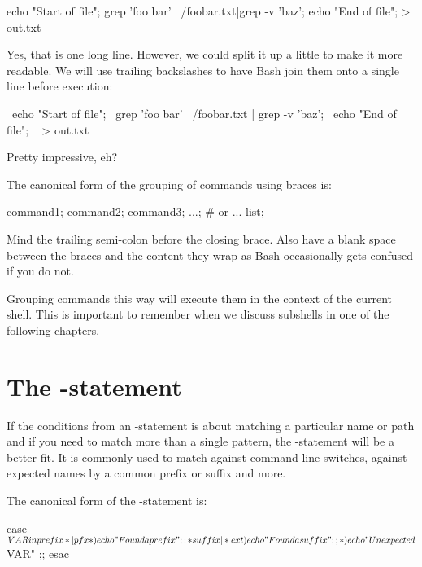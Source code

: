 \documentclass{olli-handout}
\begin{document}
\begin{lstbash}
{ echo "Start of file"; grep 'foo bar' ~/foobar.txt|grep -v 'baz'; echo "End of file"; } > out.txt
\end{lstbash}

Yes, that is one long line. However, we could split it up a little to make it more readable. We will use trailing backslashes to have Bash join them onto a single line before execution:

\begin{lstbash}
{ \
  echo "Start of file"; \
  grep 'foo bar' ~/foobar.txt | grep -v 'baz'; \
  echo "End of file"; \
} > out.txt
\end{lstbash}

Pretty impressive, eh?

The canonical form of the grouping of commands using braces is:

\begin{lstbash}
{ command1; command2; command3; ...; }
# or ...
{ list; }
\end{lstbash}

Mind the trailing semi-colon before the closing brace. Also have a blank space between the braces and the content they wrap as Bash occasionally gets confused if you do not.

Grouping commands this way will execute them in the context of the current shell. This is important to remember when we discuss subshells in one of the following chapters.

\section{The \TT{case}-statement}

\begin{refmanbash}
\end{refmanbash}

If the conditions from an -statement is about matching a particular name or path and if you need to match more than a single pattern, the -statement will be a better fit. It is commonly used to match against command line switches, against expected names by a common prefix or suffix and more.

The canonical form of the -statement is:

\begin{lstbash}
case $VAR in
  prefix*|pfx*)
    echo "Found a prefix"
    ;;
  *suffix|*ext)
    echo "Found a suffix"
    ;;
  *)
    echo "Unexpected $VAR"
    ;;
esac
\end{lstbash}
\end{document}
